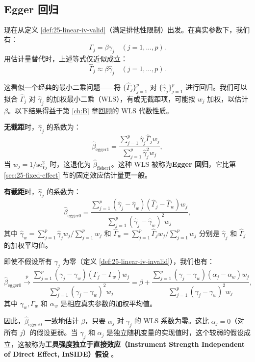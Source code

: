 \subsection{Egger 回归}\label{sec:25-egger-regression}

现在从定义 \ref{def:25-linear-iv-valid}（满足排他性限制）出发。在真实参数下，我们有：
\[
\Gamma_j = \beta\gamma_j \quad (j = 1, \dots, p). \tag{25.15}
\]
用估计量替代时，上述等式仅近似成立：
\[
\hat\Gamma_j \approx \beta \hat\gamma_j \quad (j = 1, \dots, p). \tag{25.16}
\]

这看似一个经典的最小二乘问题——将 $\{\hat\Gamma_j\}_{j=1}^p$ 对 $\{\hat\gamma_j\}_{j=1}^p$ 进行回归。我们可以拟合 $\hat\Gamma_j$ 对 $\hat\gamma_j$ 的加权最小二乘（WLS），有或无截距项，可能按 $w_j$ 加权，以估计 $\beta$。以下结果得益于第 \ref{ch:B} 章回顾的 WLS 代数性质。

\textbf{无截距}时，$\hat\gamma_j$ 的系数为：
\[
\hat\beta_{\mathrm{egger1}} = \frac{\sum_{j=1}^p \hat\gamma_j \hat\Gamma_j w_j}{\sum_{j=1}^p \hat\gamma_j^2 w_j}, \tag{25.17}
\]
当 $w_j = 1 / \mathrm{se}_{Yj}^2$ 时，这退化为 $\hat\beta_{\mathrm{fisher1}}$。这种 WLS 被称为\textbf{Egger 回归}，它比第 \ref{sec:25-fixed-effect} 节的固定效应估计量更一般。

\textbf{有截距}时，$\hat\gamma_j$ 的系数为：
\[
\hat\beta_{\mathrm{egger0}} = \frac{\sum_{j=1}^p (\hat\gamma_j - \hat\gamma_w)(\hat\Gamma_j - \hat\Gamma_w) w_j}{\sum_{j=1}^p (\hat\gamma_j - \hat\gamma_w)^2 w_j}, \tag{25.18}
\]
其中 $\hat\gamma_w = \sum_{j=1}^p \hat\gamma_j w_j / \sum_{j=1}^p w_j$ 和 $\hat\Gamma_w = \sum_{j=1}^p \hat\Gamma_j w_j / \sum_{j=1}^p w_j$ 分别是 $\hat\gamma_j$ 和 $\hat\Gamma_j$ 的加权平均值。

即使不假设所有 $\gamma_j$ 为零（定义 \ref{def:25-linear-iv-invalid}），我们也有：
\[
\hat\beta_{\mathrm{egger0}} \xrightarrow{p} \frac{\sum_{j=1}^p (\gamma_j - \gamma_w)(\Gamma_j - \Gamma_w) w_j}{\sum_{j=1}^p (\gamma_j - \gamma_w)^2 w_j} = \beta + \frac{\sum_{j=1}^p (\gamma_j - \gamma_w)(\alpha_j - \alpha_w) w_j}{\sum_{j=1}^p (\gamma_j - \gamma_w)^2 w_j}, \tag{25.19}
\]
其中 $\gamma_w, \Gamma_w$ 和 $\alpha_w$ 是相应真实参数的加权平均值。

因此，$\hat\beta_{\mathrm{egger0}}$ 一致地估计 $\beta$，只要 $\alpha_j$ 对 $\gamma_j$ 的 WLS 系数为零。这比 $\alpha_j = 0$（对所有 $j$）的假设更弱。当 $\gamma_j$ 和 $\alpha_j$ 是独立随机变量的实现值时，这个较弱的假设成立，这被称为\textbf{工具强度独立于直接效应（Instrument Strength Independent of Direct Effect, InSIDE）假设} \citep{Bowden2015}。


